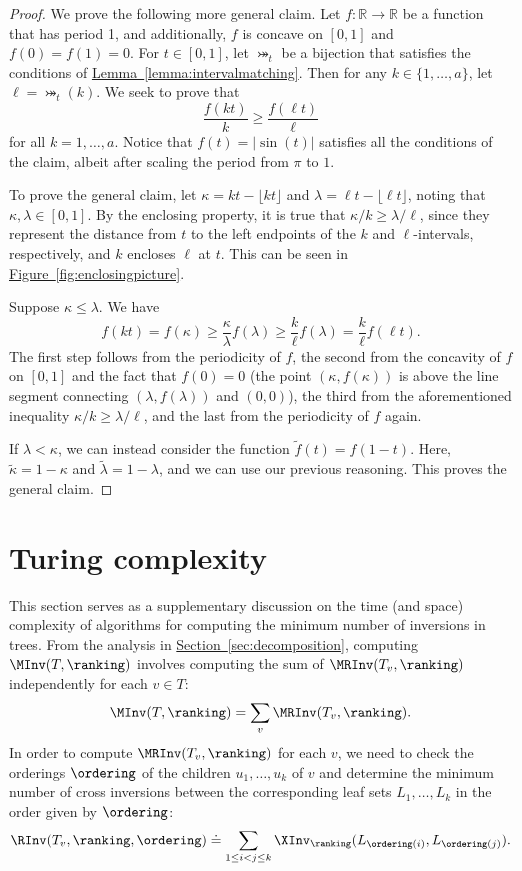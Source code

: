 \documentclass[11pt]{article}
\numberwithin{equation}{section}
\theoremstyle{definition}
\theoremstyle{plain}
\newcommand{\expref}[2]{\hyperref[#2]{#1~\ref{#2}}}
\begin{document}
\begin{proof}
    We prove the following more general claim. Let $f:\mathbb{R}\to\mathbb{R}$ be a function that has period 1, and additionally, $f$ is concave on $[0,1]$ and $f(0)=f(1)=0$. For $t\in [0,1]$, let $\bij_t$ be a bijection that satisfies the conditions of \expref{Lemma}{lemma:intervalmatching}. Then for any $k\in \{1,\dots,a\}$, let $\ell=\bij_t(k)$. We seek to prove that 
    \[\frac{f(kt)}{k}\ge \frac{f(\ell t)}{\ell} \]
    for all $k=1,\dots,a$. Notice that $f(t)=\lvert\sin(t)\rvert$ satisfies all the conditions of the claim, albeit after scaling the period from $\pi$ to $1$.
    
    To prove the general claim, let $\kappa=kt-\lfloor kt\rfloor$ and $\lambda=\ell t-\lfloor \ell t\rfloor$, noting that $\kappa,\lambda\in [0,1]$. By the enclosing property, it is true that $\kappa/k \ge \lambda/\ell$, since they represent the distance from $t$ to the left endpoints of the $k$ and $\ell$-intervals, respectively, and $k$ encloses $\ell$ at $t$. This can be seen in \expref{Figure}{fig:enclosingpicture}.
    
    Suppose $\kappa\le \lambda$. We have 
    \[f(kt)=f(\kappa) \ge \frac{\kappa}{\lambda}f(\lambda)\ge \frac{k}{\ell}f(\lambda)=\frac{k}{\ell}f(\ell t). \]
    The first step follows from the periodicity of $f$, the second from the concavity of $f$ on $[0,1]$ and the fact that $f(0)=0$ (the point $(\kappa,f(\kappa))$ is above the line segment connecting $(\lambda,f(\lambda))$ and $(0,0)$), the third from the aforementioned inequality $\kappa/k \ge \lambda/\ell$, and the last from the periodicity of $f$ again. 
    
    If $\lambda<\kappa$, we can instead consider the function $\widetilde{f}(t)=f(1-t)$. Here, $\widetilde{\kappa}=1-\kappa$ and $\widetilde{\lambda}=1-\lambda$, and we can use our previous reasoning. This proves the general claim.
\end{proof}




\section{Turing complexity}
\label{sec:turing}

This section serves as a supplementary discussion on the time (and space) complexity of algorithms for computing the minimum number of inversions in trees. From the analysis in \expref{Section}{sec:decomposition}, computing $\MInv(T,\ranking)$ involves computing the sum of $\MRInv(T_v,\ranking)$ independently for each $v\in T$:
\begin{equation*}
   \MInv(T,\ranking) = \sum_v \MRInv(T_v,\ranking).
\end{equation*}
In order to compute $\MRInv(T_v,\ranking)$ for each $v$, we need to check the orderings $\ordering$ of the children $u_1, \dots, u_k$ of $v$ and determine the minimum number of cross inversions between the corresponding leaf sets $L_1,\dots,L_k$ in the order given by $\ordering$:
\begin{equation*}
    \RInv(T_v,\ranking,\ordering) \doteq \sum_{1 \le i < j \le k} \XInv_\ranking(L_{\ordering(i)},L_{\ordering(j)}).
\end{equation*}
\end{document}
